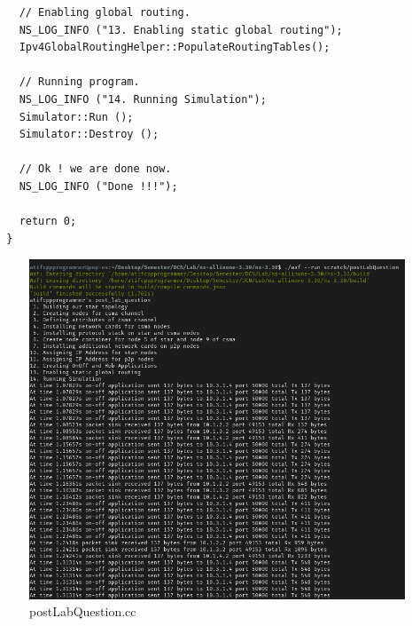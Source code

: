 \documentclass[fullpage]{article}
\begin{document}
\begin{verbatim}
    // Enabling global routing.
    NS_LOG_INFO ("13. Enabling static global routing");
    Ipv4GlobalRoutingHelper::PopulateRoutingTables();

    // Running program.
    NS_LOG_INFO ("14. Running Simulation");
    Simulator::Run ();
    Simulator::Destroy ();

    // Ok ! we are done now.
    NS_LOG_INFO ("Done !!!");

    return 0;
  }
\end{verbatim}

\begin{figure}[H]
  \includegraphics[width=\linewidth]{postLabQuestion.png}
  \caption{postLabQuestion.cc}
  \label{fig:output4}
\end{figure}
\end{document}
